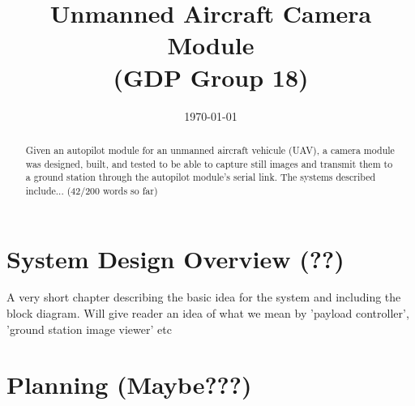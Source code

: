 \documentclass[oneside]{ecsgdp}         %
\begin{document}
\frontmatter
\title      {Unmanned Aircraft Camera Module \\(GDP Group 18)}
\date       {\today}
\subject    {ELEC6050 Group Design Project}
\maketitle
\begin{abstract}
Given an autopilot module for an unmanned aircraft vehicule (UAV), a camera module was designed, built, and tested to be able to capture still images and transmit them to a ground station through the autopilot module's serial link. The systems described include... (42/200 words so far)
\end{abstract}
\tableofcontents
\listoffigures
\listoftables
\lstlistoflistings
{}
\mainmatter


\newpage

\newpage

\newpage
\chapter{System Design Overview (??)}
A very short chapter describing the basic idea for the system and including the block diagram. Will give reader an idea of what we mean by 'payload controller', 'ground station image viewer' etc
\newpage
\chapter{Planning (Maybe???)}
\newpage

\newpage

\newpage

\newpage

\newpage

\newpage

\newpage

\newpage

\newpage

\newpage

\newpage
\end{document}
